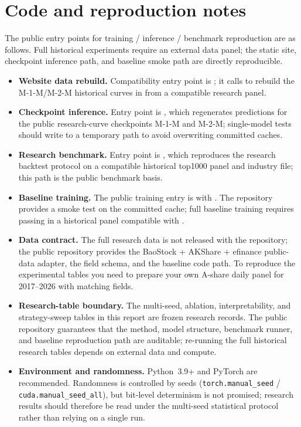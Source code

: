 \documentclass[a4paper,11pt]{article}
\begin{document}
\section{Code and reproduction notes}\label{sec:repro}
The public entry points for training / inference / benchmark reproduction are
as follows. Full historical experiments require an external data panel; the
static site, checkpoint inference path, and baseline smoke path are directly
reproducible.
\begin{itemize}
  \item \textbf{Website data rebuild.} Compatibility entry point is
  ; it calls 
  to rebuild the M-1-M/M-2-M historical curves in 
  from a compatible research panel.
  \item \textbf{Checkpoint inference.} Entry point is
  , which regenerates predictions for the public
  research-curve checkpoints M-1-M and M-2-M; single-model tests should write
  to a temporary path to avoid overwriting committed caches.
  \item \textbf{Research benchmark.} Entry point is
  , which reproduces the research backtest
  protocol on a compatible historical top1000 panel and industry file; this
  path is the public benchmark basis.
  \item \textbf{Baseline training.} The public training entry is
   with . The
  repository provides a smoke test on the committed cache; full baseline
  training requires passing in a historical panel compatible with
  .
  \item \textbf{Data contract.} The full research data is not released
  with the repository; the public repository provides the BaoStock + AKShare +
  efinance public-data adapter, the field schema, and the baseline code path. To reproduce the
  experimental tables you need to prepare your own A-share daily panel for
  2017--2026 with matching fields.
  \item \textbf{Research-table boundary.} The multi-seed, ablation,
  interpretability, and strategy-sweep tables in this report are frozen
  research records. The public repository guarantees that the method, model
  structure, benchmark runner, and baseline reproduction path are auditable;
  re-running the full historical research tables depends on external data and
  compute.
  \item \textbf{Environment and randomness.} Python~3.9+ and PyTorch are
  recommended. Randomness is controlled by seeds (\texttt{torch.manual\_seed} /
  \texttt{cuda.manual\_seed\_all}), but bit-level determinism is not promised;
  research results should therefore be read under the multi-seed statistical
  protocol rather than relying on a single run.
\end{itemize}
\end{document}
